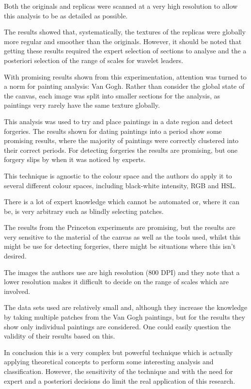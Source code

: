 \documentclass[conference]{IEEEtran}
\begin{document}
Both the originals and replicas were scanned at a very high resolution to allow
this analysis to be as detailed as possible.

The results showed that, systematically, the textures of the replicas were
globally more regular and smoother than the originals. However, it should be
noted that getting these results required the expert selection of sections to
analyse and the a posteriori selection of the range of scales for wavelet
leaders. 

With promising results shown from this experimentation, attention was turned to
a norm for painting analysis: Van Gogh. Rather than consider the global state
of the canvas, each image was split into smaller sections for the analysis, as
paintings very rarely have the same texture globally.

This analysis was used to try and place paintings in a date region and detect
forgeries. The results shown for dating paintings into a period show some
promising results, where the majority of paintings were correctly clustered
into their correct periods. For detecting forgeries the results are promising,
but one forgery slips by when it was noticed by experts.

This technique is agnostic to the colour space and the authors do apply it to
several different colour spaces, including black-white intensity, \gls{RGB} and
\gls{HSL}. 

There is a lot of expert knowledge which cannot be automated or, where it can
be, is very arbitrary such as blindly selecting patches.

The results from the Princeton experiments are promising, but the results are
very sensitive to the material of the canvas as well as the tools used, whilst
this might be use for detecting forgeries, there might be situations where this
isn't desired.

The images the authors use are high resolution (800 DPI) and they note that a
lower resolution makes it difficult to decide on the range of scales which are
involved.

The data sets used are relatively small and, although they increase the
knowledge by taking multiple patches from the Van Gogh paintings, but for the
results they show only individual paintings are considered. One could easily
question the validity of their results based on this.

In conclusion this is a very complex but powerful technique which is actually
applying theoretical concepts to perform some interesting analysis and
classification. However, the sensitivity of the technique and with the need for
expert and a posteriori decisions do limit the real application of this
research.
\end{document}
